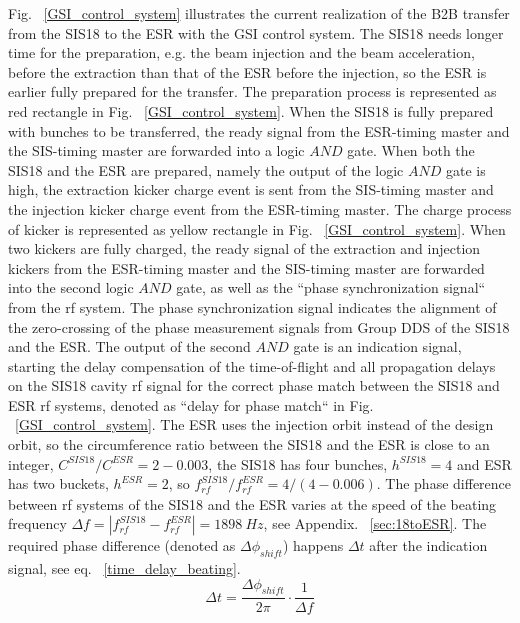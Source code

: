Fig. ~\ref{GSI_control_system} illustrates the current realization of the B2B transfer from the SIS18 to the ESR with the GSI control system. The SIS18 needs longer time for the preparation, e.g. the beam injection and the beam acceleration, before the extraction than that of the ESR before the injection, so the ESR is earlier fully prepared for the transfer. The preparation process is represented as red rectangle in Fig. ~\ref{GSI_control_system}. When the SIS18 is fully prepared with bunches to be transferred, the ready signal from the ESR-timing master and the SIS-timing master are forwarded into a logic $\textit{AND}$ gate. When both the SIS18 and the ESR are prepared, namely the output of the logic $\textit{AND}$ gate is high, the extraction kicker charge event is sent from the SIS-timing master and the injection kicker charge event from the ESR-timing master. The charge process of kicker is represented as yellow rectangle in Fig. ~\ref{GSI_control_system}. When two kickers are fully charged, the ready signal of the extraction and injection kickers from the ESR-timing master and the SIS-timing master are forwarded into the second logic $\textit{AND}$ gate, as well as the ``phase synchronization signal`` from the rf system. The phase synchronization signal indicates the alignment of the zero-crossing of the phase measurement signals from Group DDS of the SIS18 and the ESR. The output of the second $\textit{AND}$ gate is an indication signal, starting the delay compensation of the time-of-flight and all propagation delays on the SIS18 cavity rf signal for the correct phase match between the SIS18 and ESR rf systems, denoted as ``delay for phase match`` in Fig. ~\ref{GSI_control_system}. The ESR uses the injection orbit instead of the design orbit, so the circumference ratio between the SIS18 and the ESR is close to an integer, $C^{\mathit{SIS18}}/C^{\mathit{ESR}}=2-0.003$, the SIS18 has four bunches, $h^{\mathit{SIS18}}=4$ and ESR has two buckets, $h^{\mathit{ESR}}=2$, so $f^{\mathit{SIS18}}_{\mathit{rf}}/f^{\mathit{ESR}}_{\mathit{rf}}=4/(4-0.006)$. The phase difference between rf systems of the SIS18 and the ESR varies at the speed of the beating frequency $\Delta f=|f^{\mathit{SIS18}}_{\mathit{rf}}-f^{\mathit{ESR}}_{\mathit{rf}}|=\SI{1898}{Hz}$, see Appendix. ~\ref{sec:18toESR}. The required phase difference (denoted as $\Delta\phi_\mathit{shift}$) happens $\Delta t$ after the indication signal, see eq. ~\ref{time_delay_beating}. 
\begin{equation}
\Delta t= \frac{\Delta \phi_\mathit{shift}}{2\pi}\cdot\frac{1}{\Delta f}\label{time_delay_beating}
\end{equation}

